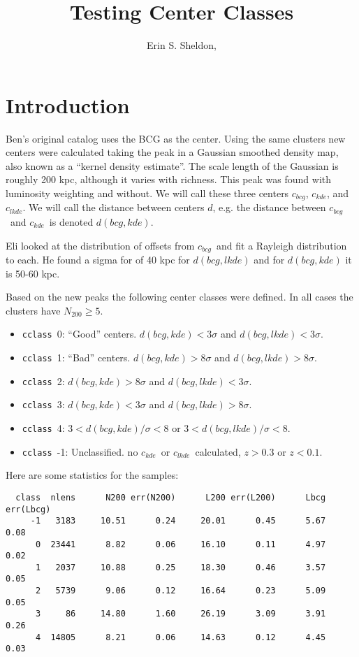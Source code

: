 \documentclass[12pt,preprint]{aastex}
\newcommand{\cbcg}{$c_{bcg}$}
\newcommand{\ckde}{$c_{kde}$}
\newcommand{\clkde}{$c_{lkde}$}
\newcommand{\cclass}{\texttt{cclass}}
\begin{document}
\title{Testing Center Classes}



\author{
Erin S. Sheldon,
}



\section{Introduction} \label{sec:intro}

Ben's original catalog uses the BCG as the center.  Using the same clusters new
centers were calculated taking the peak in a Gaussian smoothed density map,
also known as a ``kernel density estimate''.  The scale length of the Gaussian
is roughly 200 kpc, although it varies with richness.  This peak was found with
luminosity weighting and without.  We will call these three centers \cbcg,
\ckde, and \clkde.  We will call the distance between centers $d$, e.g.  the
distance between \cbcg\ and \ckde\ is denoted $d(bcg,kde)$.

Eli looked at the distribution of offsets from \cbcg\ and fit a Rayleigh 
distribution to each.  He found a sigma for of 40 kpc for $d(bcg,lkde)$
and for $d(bcg,kde)$ it is 50-60 kpc.  

Based on the new peaks the following center classes were defined.  In all cases
the clusters have $N_{200} \geq 5$.  

\begin{itemize}
    \item \cclass\ 0: ``Good'' centers.  $d(bcg,kde) < 3 \sigma$ and $d(bcg,lkde) < 3 \sigma$.
    \item \cclass\ 1: ``Bad'' centers.  $d(bcg,kde) > 8 \sigma$ and $d(bcg,lkde) > 8 \sigma$.
    \item \cclass\ 2: $d(bcg,kde) > 8 \sigma$ and $d(bcg,lkde) < 3 \sigma$.
    \item \cclass\ 3: $d(bcg,kde) < 3 \sigma$ and $d(bcg,lkde) > 8 \sigma$.
    \item \cclass\ 4: $3 < d(bcg,kde)/\sigma < 8$ or $ 3 < d(bcg,lkde)/\sigma < 8$.

    \item \cclass\ -1: Unclassified.  no \ckde\ or \clkde\ calculated, $z >
    0.3$ or $z < 0.1$.

\end{itemize}

\newpage
Here are some statistics for the samples:
\begin{verbatim}
  class  nlens      N200 err(N200)      L200 err(L200)      Lbcg err(Lbcg)
     -1   3183     10.51      0.24     20.01      0.45      5.67      0.08
      0  23441      8.82      0.06     16.10      0.11      4.97      0.02
      1   2037     10.88      0.25     18.30      0.46      3.57      0.05
      2   5739      9.06      0.12     16.64      0.23      5.09      0.05
      3     86     14.80      1.60     26.19      3.09      3.91      0.26
      4  14805      8.21      0.06     14.63      0.12      4.45      0.03
\end{verbatim}
\end{document}
